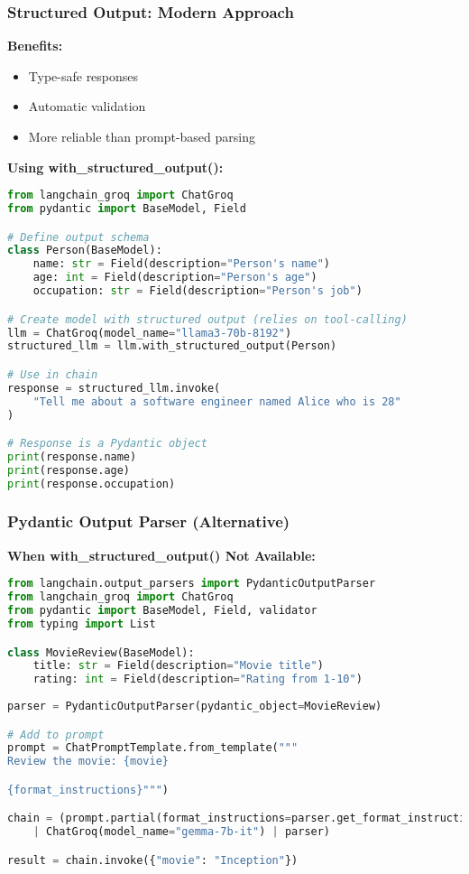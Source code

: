 \begin{frame}[fragile]\frametitle{Structured Output: Modern Approach}

\textbf{Benefits:}
\begin{itemize}
\item Type-safe responses
\item Automatic validation
\item More reliable than prompt-based parsing
\end{itemize}


\textbf{Using with\_structured\_output():}
\begin{lstlisting}[language=python, basicstyle=\tiny]
from langchain_groq import ChatGroq
from pydantic import BaseModel, Field

# Define output schema
class Person(BaseModel):
    name: str = Field(description="Person's name")
    age: int = Field(description="Person's age")
    occupation: str = Field(description="Person's job")

# Create model with structured output (relies on tool-calling)
llm = ChatGroq(model_name="llama3-70b-8192")
structured_llm = llm.with_structured_output(Person)

# Use in chain
response = structured_llm.invoke(
    "Tell me about a software engineer named Alice who is 28"
)

# Response is a Pydantic object
print(response.name)
print(response.age)
print(response.occupation)
\end{lstlisting}

\end{frame}

\begin{frame}[fragile]\frametitle{Pydantic Output Parser (Alternative)}

\textbf{When with\_structured\_output() Not Available:}
\begin{lstlisting}[language=python, basicstyle=\tiny]
from langchain.output_parsers import PydanticOutputParser
from langchain_groq import ChatGroq
from pydantic import BaseModel, Field, validator
from typing import List

class MovieReview(BaseModel):
    title: str = Field(description="Movie title")
    rating: int = Field(description="Rating from 1-10")
   
parser = PydanticOutputParser(pydantic_object=MovieReview)

# Add to prompt
prompt = ChatPromptTemplate.from_template("""
Review the movie: {movie}

{format_instructions}""")

chain = (prompt.partial(format_instructions=parser.get_format_instructions())
    | ChatGroq(model_name="gemma-7b-it") | parser)

result = chain.invoke({"movie": "Inception"})
\end{lstlisting}

\end{frame}

